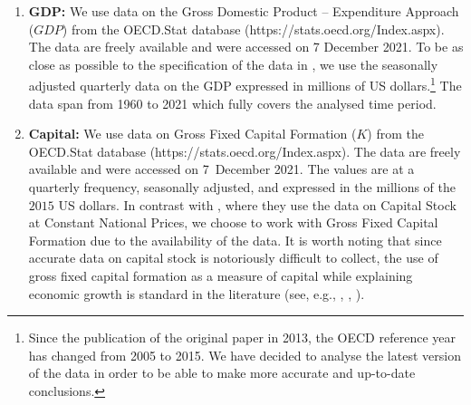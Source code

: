 \documentclass[a4paper,12pt]{article}
\begin{document}
\begin{enumerate}
\item \textbf{GDP:} We use data on the Gross Domestic Product -- Expenditure Approach ($GDP$) from the OECD.Stat \nocite{OECD} database (https://stats.oecd.org/Index.aspx). The data are freely available and were accessed on 7 December 2021. To be as close as possible to the specification of the data in \cite{Zhang2012}, we use the seasonally adjusted quarterly data on the GDP expressed in millions of  US dollars.\footnote{Since the publication of the original paper in 2013, the OECD reference year has changed from 2005 to 2015. We have decided to analyse the latest version of the data in order to be able to make more accurate and up-to-date conclusions.} The data span from 1960 to 2021 which fully covers the analysed time period. 
\item \textbf{Capital:} We use data on Gross Fixed Capital Formation ($K$) from the OECD.Stat \nocite{OECD} database (https://stats.oecd.org/Index.aspx). The data are freely available and were accessed on 7~December 2021. The values are at a quarterly frequency, seasonally adjusted, and expressed in the millions of the $2015$ US dollars. In contrast with \cite{Zhang2012}, where they use the data on Capital Stock at Constant National Prices, we choose to work with Gross Fixed Capital Formation due to the availability of the data. It is worth noting that since accurate data on capital stock is notoriously difficult to collect, the use of gross fixed capital formation as a measure of capital while explaining economic growth is standard in the literature (see, e.g., \cite{Sharma1994}, \cite{Lee2002}, \cite{Lee2005}).

\end{enumerate}
\end{document}
